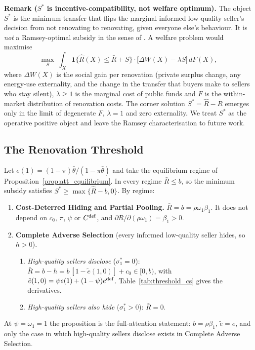 \documentclass[10pt,letterpaper]{bp-template-concise}
\begin{document}
\medskip\noindent\textbf{Remark ($S^*$ is incentive-compatibility, not welfare optimum).}\label{rem:welfare}
The object $S^*$ is the minimum transfer that flips the marginal informed low-quality seller's decision from not renovating to renovating, given everyone else's behaviour. It is \emph{not} a Ramsey-optimal subsidy in the sense of \citet{ramsey_taxation_1927}. A welfare problem would maximise
\[
    \max_S \; \int_X \mathbf{1}\{\hat R(X) \le \bar R + S\} \cdot \big[\Delta W(X) - \lambda S\big]\, dF(X),
\]
where $\Delta W(X)$ is the social gain per renovation (private surplus change, any energy-use externality, and the change in the transfer that buyers make to sellers who stay silent), $\lambda\ge 1$ is the marginal cost of public funds and $F$ is the within-market distribution of renovation costs. The corner solution $S^* = \hat R - \bar R$ emerges only in the limit of degenerate $F$, $\lambda=1$ and zero externality. We treat $S^*$ as the operative positive object and leave the Ramsey characterisation to future work.

\subsection{The Renovation Threshold}
\label{ss:threshold}

\begin{proposition}
\label{prop:threshold}
Let $e(1)=(1-\pi)\bar\theta/(1-\pi\bar\theta)$ and take the equilibrium regime of Proposition~\ref{prop:att_equilibrium}. In every regime $\bar R\le b$, so the minimum subsidy satisfies $S^*\ge\max\{\hat R-b,0\}$. By regime:
\begin{enumerate}[label=(\roman*)]
    \item \textbf{Cost-Deterred Hiding and Partial Pooling.} $\bar R=b=\rho\omega_1\beta_1$. It does not depend on $c_0$, $\pi$, $\psi$ or $C^{\rm def}$, and $\partial\bar R/\partial(\rho\omega_1)=\beta_1>0$.
    \item \textbf{Complete Adverse Selection} (every informed low-quality seller hides, so $h>0$).
    \begin{enumerate}[label=(\alph*)]
        \item \emph{High-quality sellers disclose} ($\sigma_1^*=0$): $\bar R=b-h=b\,[1-\tilde e(1,0)]+c_0\in[0,b)$, with $\tilde e(1,0)=\psi e(1)+(1-\psi)e^{\rm def}$. Table~\ref{tab:threshold_cs} gives the derivatives.
        \item \emph{High-quality sellers also hide} ($\sigma_1^*>0$): $\bar R=0$.
    \end{enumerate}
\end{enumerate}
At $\psi=\omega_1=1$ the proposition is the full-attention statement: $b=\rho\beta_1$, $\tilde e=e$, and only the case in which high-quality sellers disclose exists in Complete Adverse Selection.
\end{proposition}
\end{document}

